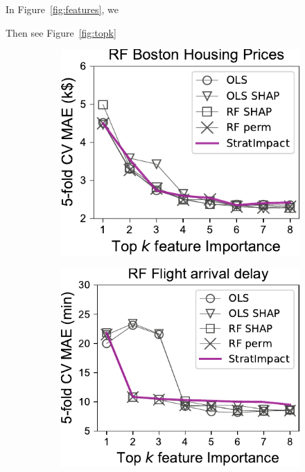 \documentclass[twoside,11pt]{article}
\newcommand{\figref}[1]{Figure~\ref{#1}}
\begin{document}
In \figref{fig:features}, we

Then see \figref{fig:topk}

\begin{figure}
\centering
\begin{subfigure}{.24\textwidth}
    \centering
\includegraphics[scale=0.48]{images/boston-topk-RF-Importance.pdf}
\end{subfigure}%
\hfill
\begin{subfigure}{.23\textwidth}
    \centering
\includegraphics[scale=0.48]{images/flights-topk-RF-Importance.pdf}

\end{subfigure}
\end{figure}
\end{document}
